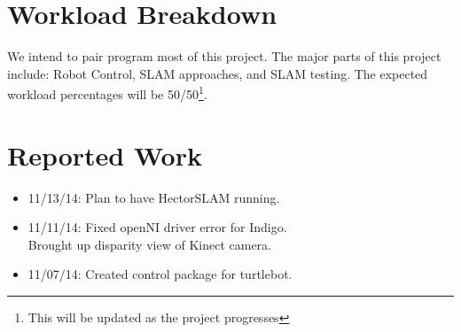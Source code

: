 \documentclass[10pt]{article}
\begin{document}
\section{Workload Breakdown}
We intend to pair program most of this project.  The major parts of this project include: Robot Control, SLAM approaches, and SLAM testing.  The expected workload percentages will be 50/50\footnote{This will be updated as the project progresses}.


\section{Reported Work}
\begin{itemize}
\item 11/13/14: Plan to have HectorSLAM running.
\item 11/11/14: Fixed openNI driver error for Indigo.\\
Brought up disparity view of Kinect camera.
\item 11/07/14: Created control package for turtlebot.
\end{itemize}
\end{document}
